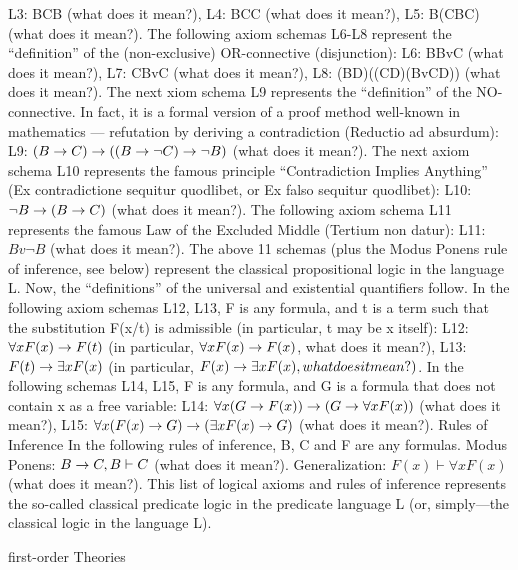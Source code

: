 L3: B\AND C\IMPLIES B (what does it mean?),
L4: B\AND C\IMPLIES C (what does it mean?),
L5: B\IMPLIES (C\IMPLIES B\AND C) (what does it mean?).
The following axiom schemas L6-L8 represent the ``definition'' of the (non-exclusive) OR-connective
(disjunction):
L6: B\IMPLIES BvC (what does it mean?),
L7: C\IMPLIES BvC (what does it mean?),
L8: (B\IMPLIES D)\IMPLIES ((C\IMPLIES D)\IMPLIES (BvC\IMPLIES D)) (what does it mean?).
The next xiom schema L9 represents the ``definition'' of the NO-connective. In fact, it is a formal version
of a proof method well-known in mathematics --- refutation by deriving a contradiction (Reductio ad
absurdum):
L9: \((B\rightarrow C)\rightarrow ((B\rightarrow \neg C)\rightarrow \neg B)\) (what does it mean?).
The next axiom schema L10 represents the famous principle ``Contradiction Implies Anything'' (Ex
contradictione sequitur quodlibet, or Ex falso sequitur quodlibet):
L10:\( \neg B\rightarrow (B\rightarrow C)\) (what does it mean?).
The following axiom schema L11 represents the famous Law of the Excluded Middle (Tertium non
datur):
L11: \(Bv\neg B\) (what does it mean?).
The above 11 schemas (plus the Modus Ponens rule of inference, see below) represent the classical
propositional logic in the language L.
Now, the ``definitions'' of the universal and existential quantifiers follow.
In the following axiom schemas L12, L13, F is any formula, and t is a term such that the substitution F(x/t)
is admissible (in particular, t may be x itself):
L12: \(\forall xF(x)\rightarrow F(t)\) (in particular, \(\forall xF(x)\rightarrow F(x)\), what does it mean?),
L13: \(F(t)\rightarrow \exists xF(x)\) (in particular, \(F(x)\rightarrow \exists xF(x), what does it mean?)\).
In the following schemas L14, L15, F is any formula, and G is a formula that does not contain x as a free
variable:
L14: \(\forall x(G\rightarrow F(x))\rightarrow (G\rightarrow \forall xF(x))\) (what does it mean?),
L15: \(\forall x(F(x)\rightarrow G)\rightarrow (\exists xF(x)\rightarrow G)\) (what does it mean?).
Rules of Inference
In the following rules of inference, B, C and F are any formulas.
Modus Ponens: \(B\rightarrow C, B \vdash C\) (what does it mean?).
Generalization: \(F(x) \vdash \forall xF(x)\) (what does it mean?).
This list of logical axioms and rules of inference represents the so-called classical predicate logic in the
predicate language L (or, simply---the classical logic in the language L).

first-order Theories

